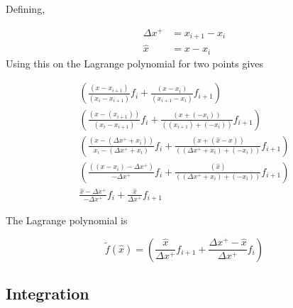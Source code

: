 \documentclass[12pt]{article}
\begin{document}
Defining,

\begin{align*}
    \Delta x^+ &= x_{i+1} - x_i \\
    \hat{x} &= x - x_i 
\end{align*}
Using this on the Lagrange polynomial for two points gives 

\begin{align*}
    \left( \frac{
            \left( x - x_{i+1} \right)
            }{
            \left( x_i - x_{i+1} \right)
        }
        f_i
        + \frac{
            \left( x - x_i  \right)
            }{
            \left(x_{i+1}- x_i \right)
        }
        f_{i+1}
    \right) \\
    \left( 
        \frac{
            \left( x - \left( x_{i+1} \right) \right)
            }{
            \left( x_i - x_{i+1}\right)
        } 
        f_i + 
        \frac{
            \left( x + \left( -x_i \right) \right)
            }{
            \left( \left( x_{i+1} \right) + \left( -x_i \right) \right)
        }
        f_{i+1}
    \right) \\
    \left(
        \frac{
            (x-\left( \Delta x^+ + x_i \right)) 
            }{
            x_i - (\Delta x^+ + x_i)
        }
        f_i
        +
        \frac{ 
            \left( x + \left( \hat{x} - x \right) \right)
            }{
            \left( \left( \Delta x^+ + x_i \right) + \left( -x_i \right) \right)
        }
        f_{i+1}
    \right)  \\
    \left(
        \frac{
            (\left(x-x_i  \right) -\Delta x^+)   
            }{ 
            - \Delta x^+ 
        }
        f_i
        +
        \frac{
            \left(   \hat{x}    \right)
            }{\left( \left(  \Delta x^+ + x_i \right)  + \left( -x_i \right) \right)
        } f_{i+1}
    \right) \\
    \frac{
        \hat{x} - \Delta x^+
        }{
        -\Delta x^+
    }
    f_i
    +
    \frac{
        \hat{x}
        }{
        \Delta x^+
    }
    f_{i+1}
\end{align*}

The Lagrange polynomial is

\begin{equation*}
    \widetilde{f}\left( \hat{x} \right) 
    =
    \left( 
        \frac{\hat{x}}{\Delta x^+}f_{i+1} +
        \frac{\Delta x^+ - \hat{x}}{\Delta x^+}f_i
    \right)
\end{equation*}

\subsection{Integration}
\end{document}
